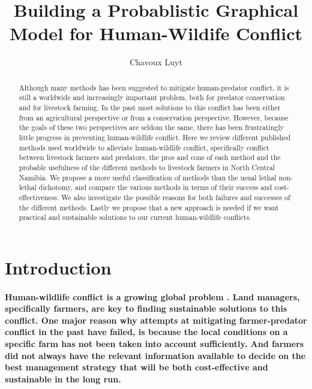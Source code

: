 
\title{Building a Probablistic Graphical Model for Human-Wildife Conflict}

\author{Chavoux Luyt}
\maketitle
\begin{abstract}
Although many methods has been suggested to mitigate human-predator
conflict, it is still a worldwide and increasingly important problem,
both for predator conservation and for livestock farming. In the past
most solutions to this conflict has been either from an agricultural
perspective or from a conservation perspective. However, because the
goals of these two perspectives are seldom the same, there has been
frustratingly little progress in preventing human-wildlife conflict.
Here we review different published methods used worldwide to alleviate
human-wildlife conflict, specifically conflict between livestock farmers
and predators, the pros and cons of each method and the probable usefulness
of the different methods to livestock farmers in North Central Namibia.
We propose a more useful classification of methods than the usual
lethal non-lethal dichotomy, and compare the various methods in terms
of their success and cost-effectiveness. We also investigate the possible
reasons for both failures and successes of the different methods.
Lastly we propose that a new approach is needed if we want practical
and sustainable solutions to our current human-wildlife conflicts.
\end{abstract}

\section{Introduction}

\paragraph{Human-wildlife conflict is a growing global problem \citep{Messmer_2000,Treves_n_Karanth_2003b,Nyhus_et_al_2005}.
Land managers, specifically farmers, are key to finding sustainable
solutions to this conflict. One major reason why attempts at mitigating
farmer-predator conflict in the past have failed, is because the local
conditions on a specific farm has not been taken into account sufficiently.
And farmers did not always have the relevant information available
to decide on the best management strategy that will be both cost-effective
and sustainable in the long run. }


